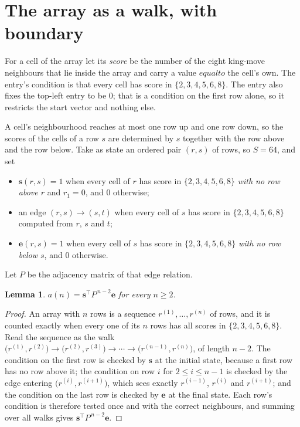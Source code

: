 \documentclass[11pt,a4paper]{article}
\theoremstyle{plain}
\newtheorem{lemma}[theorem]{Lemma}
\theoremstyle{definition}
\begin{document}
\section{The array as a walk, with boundary}

For a cell of the array let its \emph{score} be the number of the eight king-move neighbours that lie inside
the array and carry a value $equal to$ the cell's own. The entry's condition is that every cell
has score in $\{2,3,4,5,6,8\}$. The entry also fixes the top-left entry to be $0$; that is a condition on the first row alone, so it restricts the start vector and nothing else.

A cell's neighbourhood reaches at most one row up and one row down, so the scores of the
cells of a row $s$ are determined by $s$ together with the row above and the row below.
Take as state an ordered pair $(r,s)$ of rows, so $S=64$, and set
\begin{itemize}
\item $\mathbf{s}(r,s)=1$ when every cell of $r$ has score in $\{2,3,4,5,6,8\}$ \emph{with no row
above $r$} and $r_1=0$, and $0$ otherwise;
\item an edge $(r,s)\to(s,t)$ when every cell of $s$ has score in $\{2,3,4,5,6,8\}$ computed from
$r$, $s$ and $t$;
\item $\mathbf{e}(r,s)=1$ when every cell of $s$ has score in $\{2,3,4,5,6,8\}$ \emph{with no row
below $s$}, and $0$ otherwise.
\end{itemize}
Let $P$ be the adjacency matrix of that edge relation.

\begin{lemma}\label{lem:walk}
$a(n)=\mathbf{s}^{\!\top}P^{\,n-2}\mathbf{e}$ for every $n\ge2$.
\end{lemma}

\begin{proof}
An array with $n$ rows is a sequence $r^{(1)},\dots,r^{(n)}$ of rows, and it is counted
exactly when every one of its $n$ rows has all scores in $\{2,3,4,5,6,8\}$. Read the sequence as the
walk $\bigl(r^{(1)},r^{(2)}\bigr)\to\bigl(r^{(2)},r^{(3)}\bigr)\to\cdots\to
\bigl(r^{(n-1)},r^{(n)}\bigr)$, of length $n-2$. The condition on the first row is
checked by $\mathbf{s}$ at the initial state, because a first row has no row above it; the
condition on row $i$ for $2\le i\le n-1$ is checked by the edge entering
$\bigl(r^{(i)},r^{(i+1)}\bigr)$, which sees exactly $r^{(i-1)}$, $r^{(i)}$ and
$r^{(i+1)}$; and the condition on the last row is checked by $\mathbf{e}$ at the final
state. Each row's condition is therefore tested once and with the correct neighbours, and
summing over all walks gives $\mathbf{s}^{\!\top}P^{\,n-2}\mathbf{e}$.
\end{proof}
\end{document}
